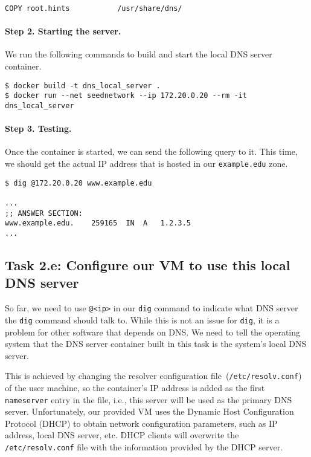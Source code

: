 \begin{lstlisting}
COPY root.hints           /usr/share/dns/
\end{lstlisting}
 


\paragraph{Step 2. Starting the server.} We run the following commands
to build and start the local DNS server container.

\begin{lstlisting}
$ docker build -t dns_local_server .
$ docker run --net seednetwork --ip 172.20.0.20 --rm -it dns_local_server
\end{lstlisting}
 

\paragraph{Step 3. Testing.} Once the container is started, we can
send the following query to it. This time, we should get the actual IP address 
that is hosted in our \texttt{example.edu} zone. 

\begin{lstlisting}
$ dig @172.20.0.20 www.example.edu

...
;; ANSWER SECTION:
www.example.edu.	259165	IN	A	1.2.3.5
...
\end{lstlisting}



\subsection{Task 2.e: Configure our VM to use this local DNS server} 

So far, we need to use \texttt{@<ip>} in our \texttt{dig} command
to indicate what DNS server the \texttt{dig} command should talk to. While this 
is not an issue for \texttt{dig}, it is a problem for other software that 
depends on DNS. We need to tell the operating system that the 
DNS server container built in this task is the system's 
local DNS server. 

This is achieved by changing
the resolver configuration file~(\texttt{/etc/resolv.conf}) of the user machine,
so the container's IP address is added as the first \texttt{nameserver} entry in the file, i.e.,
this server will be used as the primary DNS server.
Unfortunately, our provided VM uses the Dynamic Host Configuration Protocol (DHCP) to obtain
network configuration parameters, such as IP address, local DNS server, etc.
DHCP clients will overwrite the \texttt{/etc/resolv.conf} file with the information
provided by the DHCP server.

